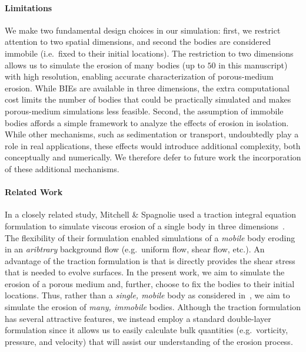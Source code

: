 \documentclass[preprint, 10pt]{elsarticle}
\begin{document}
\paragraph{Limitations}
We make two fundamental design choices in our simulation: first, we restrict attention to two spatial dimensions, and second the bodies are considered immobile (i.e.~fixed to their initial locations). The restriction to two dimensions allows us to simulate the erosion of many bodies (up to $50$ in this manuscript) with high resolution, enabling accurate characterization of porous-medium erosion. While BIEs are available in three dimensions, the extra computational cost limits the number of bodies that could be practically simulated and makes porous-medium simulations less feasible. Second, the assumption of immobile bodies affords a simple framework to analyze the effects of erosion in isolation. While other mechanisms, such as sedimentation or transport, undoubtedly play a role in real applications, these effects would introduce additional complexity, both conceptually and numerically. We therefore defer to future work the incorporation of these additional mechanisms.

\paragraph{Related Work}
In a closely related study, Mitchell \& Spagnolie used a traction integral equation formulation to simulate viscous erosion of a single body in three dimensions~\cite{mit-spa2016}. The flexibility of their formulation enabled simulations of a {\em mobile} body eroding in an {\em aribtrary} background flow (e.g.~uniform flow, shear flow, etc.).  An advantage of the traction formulation is that is directly provides the shear stress that is needed to evolve surfaces.  In the present work, we aim to simulate the erosion of a porous medium and, further, choose to fix the bodies to their initial locations. Thus, rather than a {\em single, mobile} body as considered in~\cite{mit-spa2016}, we aim to simulate the erosion of {\em many, immobile} bodies. Although the traction formulation has several attractive features, we instead employ a standard double-layer formulation since it allows us to easily calculate bulk quantities (e.g.~vorticity, pressure, and velocity) that will assist our understanding of the erosion process.
\end{document}
